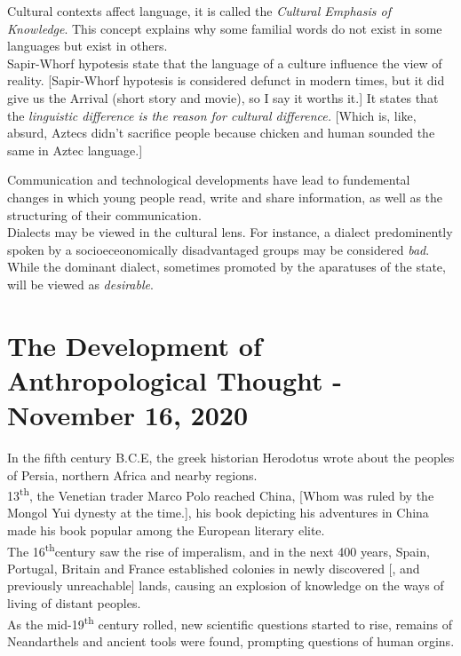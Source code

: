 \documentclass[11pt,a4paper]{book}
\begin{document}
Cultural contexts affect language, it is called the \textit{Cultural Emphasis of Knowledge}. This concept explains why some familial words do not exist in some languages but exist in others.\\

Sapir-Whorf hypotesis state that the language of a culture influence the view of reality. [Sapir-Whorf hypotesis is considered defunct in modern times, but it did give us the Arrival (short story and movie), so I say it worths it.] It states that the \textit{linguistic difference is the reason for cultural difference.} [Which is, like, absurd, Aztecs didn't sacrifice people because chicken and human sounded the same in Aztec language.]

Communication and technological developments have lead to fundemental changes in which young people read, write and share information, as well as the structuring of their communication.\\

Dialects may be viewed in the cultural lens. For instance, a dialect predominently spoken by a socioeceonomically disadvantaged groups may be considered \textit{bad}. While the dominant dialect, sometimes promoted by the aparatuses of the state, will be viewed as \textit{desirable}. 

\chapter{The Development of Anthropological Thought - November 16, 2020}

In the fifth century B.C.E, the greek historian Herodotus wrote about the peoples of Persia, northern Africa and nearby regions.\\

13\textsuperscript{th}, the Venetian trader Marco Polo reached China, [Whom was ruled by the Mongol Yui dynesty at the time.], his book depicting his adventures in China made his book popular among the European literary elite.\\

The 16\textsuperscript{th}century saw the rise of imperalism, and in the next 400 years, Spain, Portugal, Britain and France established colonies in newly discovered [, and previously unreachable] lands, causing an explosion of knowledge on the ways of living of distant peoples.\\

As the mid-19\textsuperscript{th} century rolled, new scientific questions started to rise, remains of Neandarthels and ancient tools were found, prompting questions of human orgins.\\
\end{document}
